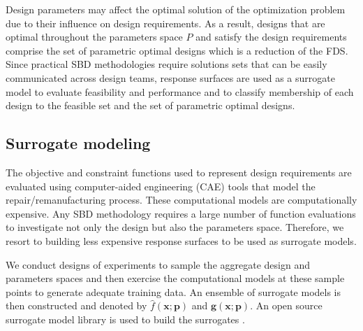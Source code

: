 Design parameters may affect the optimal solution of the optimization problem due to their influence on design requirements. As a result, designs that are optimal throughout the parameters space $\mathit{P}$ and satisfy the design requirements comprise the set of parametric optimal designs which is a reduction of the \ac{FDS}. Since practical \ac{SBD} methodolog\-ies require solutions sets that can be easily communicated across design teams, response surfaces are used as a surrogate model to evaluate feasibility and performance and to classify membership of each design to the feasible set and the set of parametric optimal designs. 

\subsection{Surrogate modeling} \label{subsec:RSM}

The objective and constraint functions used to represent design requirements are evaluated using computer-aided engineering (CAE) tools that model the repair/remanufacturing process.  
These computational models are computationally expensive. Any SBD methodology requires a large number of function evaluations to investigate not only the design but also the parameters space. Therefore, we resort to building less expensive response surfaces to be used as surrogate models.

We conduct designs of experiments to sample the aggregate design and parameters spaces and then exercise the computational models at these sample points to generate adequate training data. An ensemble of surrogate models is then constructed and denoted by $\hat{f}(\mathbf{x};{\mathbf{p}})$ and $\hat{\mathbf{g}}(\mathbf{x};{\mathbf{p}})$. An open source surrogate model library is used to build the surrogates \cite{Talgorn2018,Lophaven2002}.

